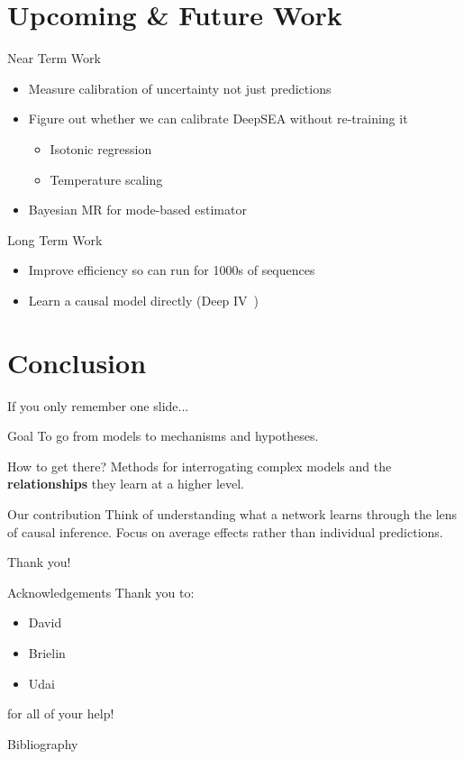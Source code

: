 \documentclass[pdf]{beamer} %
\begin{document}
\section{Upcoming \& Future Work}
\begin{frame}[t]{Near Term Work}
    \begin{itemize}
        \item Measure calibration of uncertainty not just predictions
        \item Figure out whether we can calibrate DeepSEA without re-training it
            \begin{itemize}
                \item Isotonic regression
                \item Temperature scaling
            \end{itemize}
        \item Bayesian MR for mode-based estimator
    \end{itemize}
\end{frame}

\begin{frame}[t]{Long Term Work}
    \begin{itemize}
        \item Improve efficiency so can run for 1000s of sequences
        \item Learn a causal model directly (Deep IV~\cite{Hartford2017-cm})
    \end{itemize} 
\end{frame}

\section{Conclusion}
\begin{frame}[t]{If you only remember one slide...}
   \begin{block}{Goal}
        To go from models to mechanisms and hypotheses.
   \end{block} 
   \begin{block}{How to get there?}
       Methods for interrogating complex models and the \textbf{relationships} they learn at a higher level.
   \end{block}
   \begin{block}{Our contribution}
       Think of understanding what a network learns through the lens of causal inference. Focus on average effects rather than individual predictions.
   \end{block}

   Thank you!
\end{frame}

\begin{frame}[t]{Acknowledgements}
    Thank you to:
    \begin{itemize}
        \item David
        \item Brielin
        \item Udai
    \end{itemize}
    for all of your help!
\end{frame}

\begin{frame}[allowframebreaks]{Bibliography}
    
\end{frame}
\end{document}
